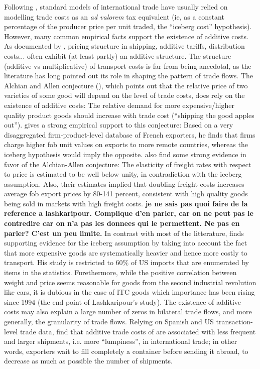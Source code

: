 \documentclass[a4paper,11pt]{article}
\begin{document}
Following \citet{samuelson1954}, standard models of international trade have usually relied on modelling trade costs as an \emph{ad valorem} tax equivalent (ie, as a constant percentage of the producer price per unit traded, the ``iceberg cost'' hypothesis). However, many common empirical facts support the existence of additive costs. As documented by \citet{Irrazabal_2015}, pricing structure in shipping, additive tariffs, distribution costs... often exhibit (at least partly) an additive structure. The structure (additive vs multiplicative) of transport costs is far from being anecdotal, as the literature has long pointed out its role in shaping the pattern of trade flows. The Alchian and Allen conjecture (\citealp{alchian}), which points out that the relative price of two varieties of some good will depend on the level of trade costs, does rely on the existence of additive costs: The relative demand for more expensive/higher quality product goods should increase with trade cost (``shipping the good apples out''). \citet{martin2012} gives a strong empirical support to this conjecture: Based on a very disaggregated firm-product-level database of French exporters, he finds that firms charge higher fob unit values on exports to more remote countries, whereas the iceberg hypothesis would imply the opposite. \citet{hummels_skiba} also find some strong evidence in favor of the Alchian-Allen conjecture: The elasticity of freight rates with respect to price is estimated to be well below unity, in contradiction with the iceberg assumption. Also, their estimates implied that doubling freight costs increases average fob export prices by 80-141 percent, consistent with high quality goods being sold in markets with high freight costs.
\textbf{je ne sais pas quoi faire de la reference a lashkaripour. Complique d'en parler, car on ne peut pas le contredire car on n'a pas les donnees qui le permettent. Ne pas en parler? C'est un peu limite.}
In contrast with most of the litterature, \citet{lashkaripour} finds supporting evidence for the iceberg assumption by taking into account the fact that more expensive goods are systematically heavier and hence more costly to transport. His study is restricted to 60\% of US imports that are enumerated by items in the statistics. Furethermore, while the positive correlation between weight and price seems reasonable for goods from the second industrial revolution like cars, it is dubious in the case of ITC goods which importance has been rising since 1994 (the end point of Lashkaripour's study).
The existence of additive costs may also explain a large number of zeros in bilateral trade flows, and more generally, the granularity of trade flows. Relying on Spanish and US transaction-level trade data, \citet{Hornok14} find that additive trade costs of are associated with less frequent and larger shipments, i.e. more ``lumpiness'', in international trade; in other words, exporters wait to fill completely a container before sending it abroad, to decrease as much as possible the number of shipments.
\end{document}
